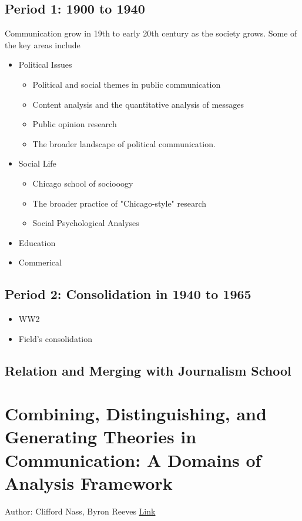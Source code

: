\subsection{Period 1: 1900 to 1940} 
Communication grow in 19th to early 20th century as the society grows. Some of the key areas include 
    \begin{itemize}
        \item Political Issues 
            \begin{itemize}
                \item Political and social themes in public communication 
                \item Content analysis and the quantitative analysis of messages 
                \item Public opinion research 
                \item The broader landscape of political communication. 
            \end{itemize}
        \item Social Life 
            \begin{itemize}
                \item Chicago school of sociooogy 
                \item The broader practice of "Chicago-style" research 
                \item Social Psychological Analyses 
            \end{itemize}
        \item Education
        \item Commerical 
    \end{itemize}

\subsection{Period 2: Consolidation in 1940 to 1965}
    \begin{itemize}
        \item WW2
        \item Field's consolidation 
    \end{itemize}
    
\subsection{Relation and Merging with Journalism School}





\section{Combining, Distinguishing, and Generating Theories in Communication: A Domains of Analysis Framework }
Author: Clifford Nass, Byron Reeves \href{https://journals.sagepub.com/doi/abs/10.1177/009365091018002006}{Link}

